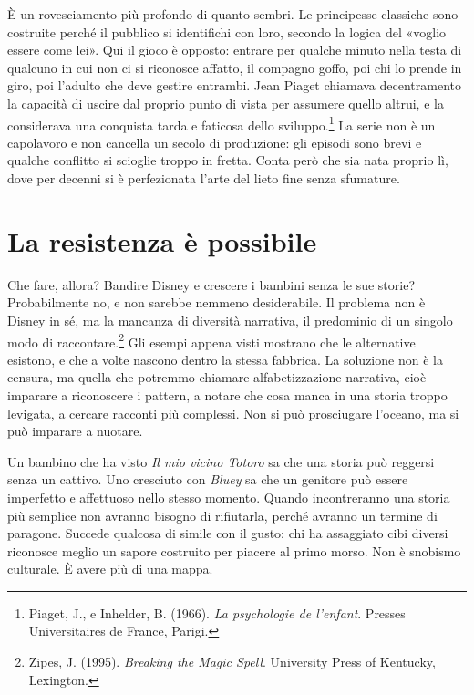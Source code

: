 È un rovesciamento più profondo di quanto sembri. Le principesse classiche sono costruite perché il pubblico si identifichi con loro, secondo la logica del «voglio essere come lei». Qui il gioco è opposto: entrare per qualche minuto nella testa di qualcuno in cui non ci si riconosce affatto, il compagno goffo, poi chi lo prende in giro, poi l'adulto che deve gestire entrambi. Jean Piaget chiamava decentramento la capacità di uscire dal proprio punto di vista per assumere quello altrui, e la considerava una conquista tarda e faticosa dello sviluppo.\footnote{Piaget, J., e Inhelder, B. (1966). \textit{La psychologie de l'enfant}. Presses Universitaires de France, Parigi.} La serie non è un capolavoro e non cancella un secolo di produzione: gli episodi sono brevi e qualche conflitto si scioglie troppo in fretta. Conta però che sia nata proprio lì, dove per decenni si è perfezionata l'arte del lieto fine senza sfumature.

\section{La resistenza \`{e} possibile}

Che fare, allora? Bandire Disney e crescere i bambini senza le sue storie? Probabilmente no, e non sarebbe nemmeno desiderabile. Il problema non \`{e} Disney in s\'{e}, ma la mancanza di diversit\`{a} narrativa, il predominio di un singolo modo di raccontare.\footnote{Zipes, J. (1995). \textit{Breaking the Magic Spell}. University Press of Kentucky, Lexington.} Gli esempi appena visti mostrano che le alternative esistono, e che a volte nascono dentro la stessa fabbrica. La soluzione non \`{e} la censura, ma quella che potremmo chiamare alfabetizzazione narrativa, cioè imparare a riconoscere i pattern, a notare che cosa manca in una storia troppo levigata, a cercare racconti pi\`{u} complessi. Non si pu\`{o} prosciugare l'oceano, ma si pu\`{o} imparare a nuotare.

Un bambino che ha visto \textit{Il mio vicino Totoro} sa che una storia può reggersi senza un cattivo. Uno cresciuto con \textit{Bluey} sa che un genitore può essere imperfetto e affettuoso nello stesso momento. Quando incontreranno una storia più semplice non avranno bisogno di rifiutarla, perché avranno un termine di paragone. Succede qualcosa di simile con il gusto: chi ha assaggiato cibi diversi riconosce meglio un sapore costruito per piacere al primo morso. Non è snobismo culturale. È avere più di una mappa.

